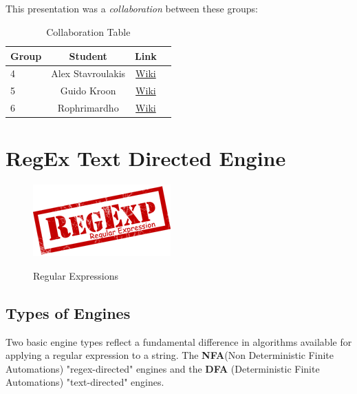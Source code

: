 \documentclass[a4paper,11pt]{report}
\begin{document}
\paragraph{}
This presentation was a \emph{collaboration} between these groups: \\
 
\begin{table}[h]
\centering
 \begin{tabular}{| l | c | c | c |}
 \hline \textbf{Group} & \textbf{Student} & \textbf{Link} \\
 \hline 
 4 & Alex Stavroulakis & \href{https://www.os3.nl/2014-2015/students/alexandros_stavroulakis/es}{Wiki}\\
 \hline 
 5 & Guido Kroon & \href{https://www.os3.nl/2014-2015/students/guido_kroon/es/assignments1}{Wiki} \\ 
 \hline 
 6 & Rophrimardho & \href{https://www.os3.nl/2014-2015/students/rohprimardho/es/homework_1.3}{Wiki} \\ 
 \hline 
 \end{tabular} 
 \caption[Collaboration Table]{Collaboration Table}
\end{table}
 


\chapter{RegEx Text Directed Engine}

\begin{figure}[h]
	\centering
		\includegraphics{images/regexp_logo.png}~\\[1cm]
		\caption{Regular Expressions}
\end{figure}

\section{Types of Engines}
\begin{flushleft}
Two basic engine types reflect a fundamental difference in algorithms available for applying a regular expression to a string. The \textbf{NFA}(Non Deterministic Finite Automations) "regex-directed" engines and the \textbf{DFA} (Deterministic Finite Automations) "text-directed" engines. \cite{NFA,DFA}
\end{flushleft}
\end{document}
